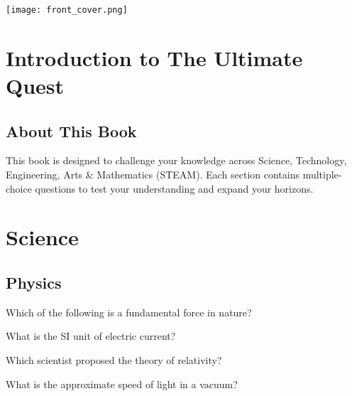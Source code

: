 \documentclass[12pt,a4paper]{book}
\begin{document}
\thispagestyle{empty}
\texttt{[image: front\_cover.png]}
\clearpage

\chapter{Introduction to The Ultimate Quest}
\section{About This Book}
This book is designed to challenge your knowledge across Science, Technology, Engineering, Arts \& Mathematics (STEAM). Each section contains multiple-choice questions to test your understanding and expand your horizons.

\lipsum[1]

\chapter{Science}
\section{Physics}

\begin{enhancedmcq}{Which of the following is a fundamental force in nature?}
\end{enhancedmcq}

\begin{enhancedmcq}[SI Units]{What is the SI unit of electric current?}
\end{enhancedmcq}

\begin{enhancedmcq}{Which scientist proposed the theory of relativity?}
\end{enhancedmcq}

\begin{enhancedmcq}[Light]{What is the approximate speed of light in a vacuum?}
\end{enhancedmcq}
\end{document}
